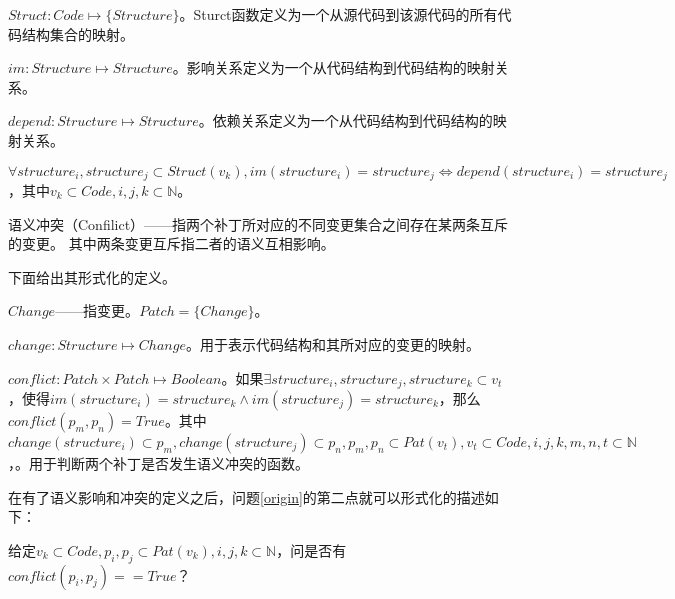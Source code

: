 \begin{definition}
	$Struct: Code \mapsto \{ Structure \}$。Sturct函数定义为一个从源代码到该源代码的所有代码结构集合的映射。
\end{definition}

\begin{definition}
	$im: Structure \mapsto Structure$。影响关系定义为一个从代码结构到代码结构的映射关系。
\end{definition}

\begin{definition}
	$depend: Structure \mapsto Structure$。依赖关系定义为一个从代码结构到代码结构的映射关系。
\end{definition}

\begin{definition}
	$\forall structure_i,structure_j \subset Struct(v_k),  im(structure_i) = structure_j \iff depend(structure_i) = structure_j$，其中$v_k \subset Code,i,j,k \subset \mathbb{N}$。
\end{definition}


\begin{definition}
	\label {define_conflict}
	语义冲突（Confilict）——指两个补丁所对应的不同变更集合之间存在某两条互斥的变更。
	其中两条变更互斥指二者的语义互相影响。
\end{definition}

下面给出其形式化的定义。

\begin{definition}
	$Change$——指变更。$Patch = \{Change\}$。
\end{definition}

\begin{definition}
	$change: Structure \mapsto Change$。用于表示代码结构和其所对应的变更的映射。
\end{definition}


\begin{definition}
	$conflict: Patch \times Patch \mapsto Boolean$。如果$\exists structure_i,structure_j,structure_k \subset v_t$，使得$im(structure_i) = structure_k \land im(structure_j) = structure_k$，那么$conflict(p_m,p_n) = True$。其中$change(structure_i) \subset p_m,change(structure_j) \subset p_n,p_m,p_n \subset Pat(v_t),v_t \subset Code,i,j,k,m,n,t \subset \mathbb{N}$，。用于判断两个补丁是否发生语义冲突的函数。
\end{definition}

在有了语义影响和冲突的定义之后，问题\ref {origin}的第二点就可以形式化的描述如下：

	给定$v_k \subset Code, p_i,p_j \subset Pat(v_k),i,j,k \subset \mathbb{N}$，问是否有$conflict(p_i,p_j) == True$？

